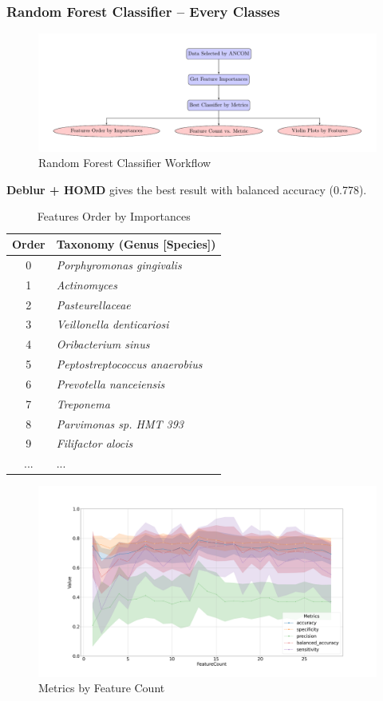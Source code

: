 \documentclass{beamer}
\begin{document}
    \begin{frame}[allowframebreaks]
        \frametitle{Random Forest Classifier -- Every Classes}

        \begin{figure}
            \includegraphics[width=0.8 \linewidth]{figures/RandomForest/whole.pdf}
            \caption{Random Forest Classifier Workflow}
        \end{figure}

        \textbf{Deblur + HOMD} gives the best result with balanced accuracy (0.778).

        \begin{table}
            \caption{Features Order by Importances}
            \begin{tabular}{c|l}
                Order & Taxonomy (Genus [Species]) \\ \hline
                0 & \textit{Porphyromonas gingivalis} \\
                1 & \textit{Actinomyces} \\
                2 & \textit{Pasteurellaceae} \\
                3 & \textit{Veillonella denticariosi} \\
                4 & \textit{Oribacterium sinus} \\
                5 & \textit{Peptostreptococcus anaerobius} \\
                6 & \textit{Prevotella nanceiensis} \\
                7 & \textit{Treponema} \\
                8 & \textit{Parvimonas sp. HMT 393} \\
                9 & \textit{Filifactor alocis} \\
                ... & ... \\
            \end{tabular}
        \end{table}

        \begin{figure}
            \includegraphics[width=0.8 \linewidth]{figures/RandomForest/ANCOM.Deblur.homd/metrics.png}
            \caption{Metrics by Feature Count}
        \end{figure}


\end{frame}
\end{document}
